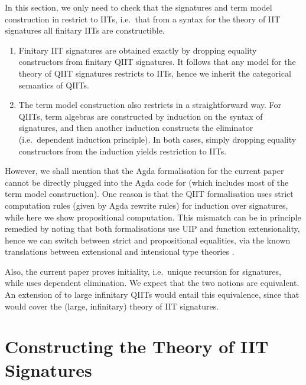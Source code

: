 \documentclass[a4paper,UKenglish,cleveref, autoref]{lipics-v2019}
\begin{document}
In this section, we only need to check that the signatures and term model
construction in \cite{Kaposi:2019:CQI:3302515.3290315} restrict to IITs,
i.e.\ that from a syntax for the theory of IIT signatures all finitary IITs are
constructible.

\begin{enumerate}
\item
  Finitary IIT signatures are obtained exactly by dropping equality constructors from
  finitary QIIT signatures. It follows that any model for the theory of QIIT signatures
  restricts to IITs, hence we inherit the categorical semantics of QIITs.
\item
  The term model construction also restricts in a straightforward way. For QIITs,
  term algebras are constructed by induction on the syntax of signatures, and
  then another induction constructs the eliminator (i.e.\ dependent induction
  principle). In both cases, simply dropping equality constructors from the
  induction yields restriction to IITs.
\end{enumerate}

However, we shall mention that the Agda formalisation for the current paper
cannot be directly plugged into the Agda code for
\cite{Kaposi:2019:CQI:3302515.3290315} (which includes most of the term model
construction). One reason is that the QIIT formalisation uses strict computation
rules (given by Agda rewrite rules) for induction over signatures, while here we show propositional
computation. This mismatch can be in principle remedied by noting that both
formalisations use UIP and function extensionality, hence we can switch between
strict and propositional equalities, via the known translations between
extensional and intensional type
theories \cite{hofmann95extensional,winterhalter2019eliminating}.

Also, the current paper proves initiality, i.e.\ unique recursion for
signatures, while \cite{Kaposi:2019:CQI:3302515.3290315} uses dependent
elimination. We expect that the two notions are equivalent. An extension of
\cite{Kaposi:2019:CQI:3302515.3290315} to large infinitary QIITs would entail
this equivalence, since that would cover the (large, infinitary) theory of IIT
signatures.


\section{Constructing the Theory of IIT Signatures}
\label{sec:ambroise}
\end{document}
